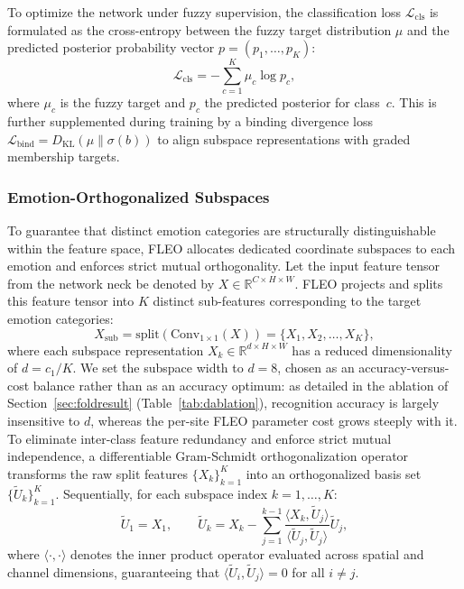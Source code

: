 \documentclass[algorithms,article,submit,moreauthors]{Definitions/mdpi}
\newcommand{\rev}[1]{\textcolor{revcolor}{#1}}
\begin{document}
To optimize the network under fuzzy supervision, the classification loss $\mathcal{L}_{\text{cls}}$ is formulated as the cross-entropy between the fuzzy target distribution $\mu$ and the predicted posterior probability vector $p = (p_1, \dots, p_K)$:
\begin{equation}
\mathcal{L}_{\text{cls}} = -\sum_{c=1}^{K} \mu_c \log p_c,
\label{eq:fuzzy_loss}
\end{equation}
\rev{where \mbox{$\mu_c$} is the fuzzy target and \mbox{$p_c$} the predicted posterior for class~\mbox{$c$}.} This is further supplemented during training by a binding divergence loss $\mathcal{L}_{\text{bind}} = D_{\text{KL}}(\mu \parallel \sigma(b))$ to align subspace representations with graded membership targets.

\subsubsection{Emotion-Orthogonalized Subspaces}

To guarantee that distinct emotion categories are structurally distinguishable within the feature space, FLEO allocates dedicated coordinate subspaces to each emotion and enforces strict mutual orthogonality. Let the input feature tensor from the network neck be denoted by $X \in \mathbb{R}^{C \times H \times W}$. FLEO projects and splits this feature tensor into $K$ distinct sub-features corresponding to the target emotion categories:
\begin{equation}
X_{\text{sub}} = \text{split}\left(\text{Conv}_{1\times1}(X)\right) = \{X_1, X_2, \dots, X_K\},
\label{eq:subspace_split}
\end{equation}
where each subspace representation $X_k \in \mathbb{R}^{d \times H \times W}$ has a reduced dimensionality of $d = c_1/K$. \rev{We set the subspace width to \mbox{$d = 8$}, chosen as an accuracy-versus-cost balance rather than as an accuracy optimum: as detailed in the ablation of Section~\ref{sec:foldresult} (Table~\ref{tab:dablation}), recognition accuracy is largely insensitive to \mbox{$d$}, whereas the per-site FLEO parameter cost grows steeply with it.} To eliminate inter-class feature redundancy and enforce strict mutual independence, a differentiable Gram-Schmidt orthogonalization operator transforms the raw split features $\{X_k\}_{k=1}^{K}$ into an orthogonalized basis set $\{\tilde{U}_k\}_{k=1}^{K}$. Sequentially, for each subspace index $k = 1, \dots, K$:
\begin{equation}
\tilde{U}_1 = X_1, \qquad \tilde{U}_k = X_k - \sum_{j=1}^{k-1} \frac{\langle X_k, \tilde{U}_j \rangle}{\langle \tilde{U}_j, \tilde{U}_j \rangle} \tilde{U}_j,
\label{eq:gram_schmidt}
\end{equation}
where $\langle \cdot, \cdot \rangle$ denotes the inner product operator evaluated across spatial and channel dimensions, guaranteeing that $\langle \tilde{U}_i, \tilde{U}_j \rangle = 0$ for all $i \neq j$. 
\end{document}
